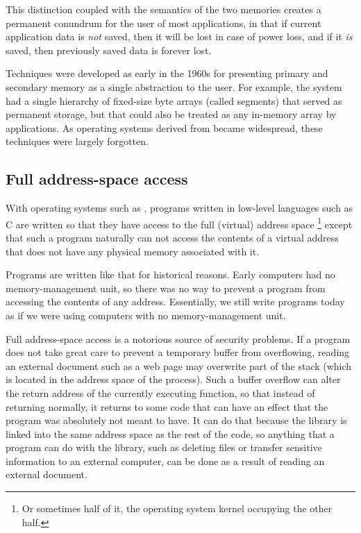 This distinction coupled with the semantics of the two memories
creates a permanent conundrum for the user of most applications, in
that if current application data is \emph{not} saved, then it will
be lost in case of power loss, and if it \emph{is} saved, then
previously saved data is forever lost. 

Techniques were developed as early in the 1960s for presenting
primary and secondary memory as a single abstraction to the user.
For example, the \multics{} system had a single hierarchy of fixed-size
byte arrays (called segments) that served as permanent storage, but
that could also be treated as any in-memory array by applications.
As operating systems derived from \unix{} became widespread, these
techniques were largely forgotten. 

\subsection{Full address-space access}

With operating systems such as \unix{}, programs written in low-level
languages such as C are written so that they have access to the full
(virtual) address space%
\footnote{Or sometimes half of it, the operating system kernel
  occupying the other half.}
except that such a program naturally can not access the contents of a
virtual address that does not have any physical memory associated with
it.

Programs are written like that for historical reasons.  Early
computers had no memory-management unit, so there was no way to
prevent a program from accessing the contents of any address.
Essentially, we still write programs today as if we were using
computers with no memory-management unit.

Full address-space access is a notorious source of security problems.
If a program does not take great care to prevent a temporary buffer
from overflowing, reading an external document such as a web page may
overwrite part of the stack (which is located in the address space of
the process).  Such a buffer overflow can alter the return address of
the currently executing function, so that instead of returning
normally, it returns to some code that can have an effect that the
program was absolutely not meant to have.  It can do that because the
\clanguage{} library is linked into the same address space as the rest
of the code, so anything that a program can do with the \clanguage{}
library, such as deleting files or transfer sensitive information to
an external computer, can be done as a result of reading an external
document.

